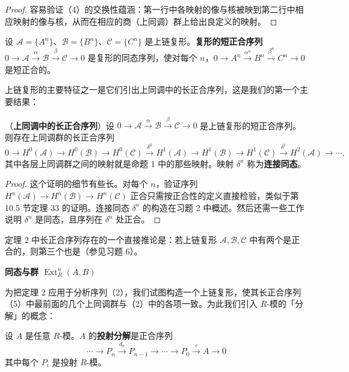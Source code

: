 \begin{proof}
容易验证（4）的交换性蕴涵：第一行中各映射的像与核被映到第二行中相应映射的像与核，从而在相应的商（上同调）群上给出良定义的映射。
\end{proof}

\begin{definition}
设 \(\mathcal{A} = \{A^n\}\)、\(\mathcal{B} = \{B^n\}\)、\(\mathcal{C} = \{C^n\}\) 是上链复形。\textbf{复形的短正合序列} \(0 \to \mathcal{A} \xrightarrow{\alpha} \mathcal{B} \xrightarrow{\beta} \mathcal{C} \to 0\) 是复形的同态序列，使对每个 \(n\)，\(0 \to A^n \xrightarrow{\alpha^n} B^n \xrightarrow{\beta^n} C^n \to 0\) 是短正合的。
\end{definition}

上链复形的主要特征之一是它们引出上同调中的长正合序列，这是我们的第一个主要结果：

\begin{theorem}\label{thm:17.2}
（\textbf{上同调中的长正合序列}）设 \(0 \to \mathcal{A} \xrightarrow{\alpha} \mathcal{B} \xrightarrow{\beta} \mathcal{C} \to 0\) 是上链复形的短正合序列。则存在上同调群的长正合序列
\[
0 \to H^0(\mathcal{A}) \to H^0(\mathcal{B}) \to H^0(\mathcal{C}) \xrightarrow{\delta^0} H^1(\mathcal{A}) \to H^1(\mathcal{B}) \to H^1(\mathcal{C}) \xrightarrow{\delta^1} H^2(\mathcal{A}) \to \cdots, \tag{17.5}
\]
其中各层上同调群之间的映射就是命题 1 中的那些映射。映射 \(\delta^n\) 称为\textbf{连接同态}。
\end{theorem}

\begin{proof}
这个证明的细节有些长。对每个 \(n\)，验证序列 \(H^n(\mathcal{A}) \to H^n(\mathcal{B}) \to H^n(\mathcal{C})\) 正合只需按正合性的定义直接检验，类似于第 10.5 节定理 33 的证明。连接同态 \(\delta^n\) 的构造在习题 2 中概述。然后还需一些工作说明 \(\delta^n\) 是同态，且序列在 \(\delta^n\) 处正合。
\end{proof}

定理 2 中长正合序列存在的一个直接推论是：若上链复形 \(\mathcal{A}, \mathcal{B}, \mathcal{C}\) 中有两个是正合的，则第三个也是（参见习题 6）。

\noindent\textbf{同态与群 \texorpdfstring{\(\operatorname{Ext}_R^n(A,B)\)}{Ext(A,B)}}

为把定理 2 应用于分析序列（2），我们试图构造一个上链复形，使其长正合序列（5）中最前面的几个上同调群与（2）中的各项一致。为此我们引入 \(R\)-模的「分解」的概念：

\begin{definition}
设 \(A\) 是任意 \(R\)-模。\(A\) 的\textbf{投射分解}是正合序列
\[
\cdots \longrightarrow P_n \xrightarrow{d_n} P_{n-1} \longrightarrow \cdots \longrightarrow P_0 \xrightarrow{\varepsilon} A \longrightarrow 0 \tag{17.6}
\]
其中每个 \(P_i\) 是投射 \(R\)-模。
\end{definition}

